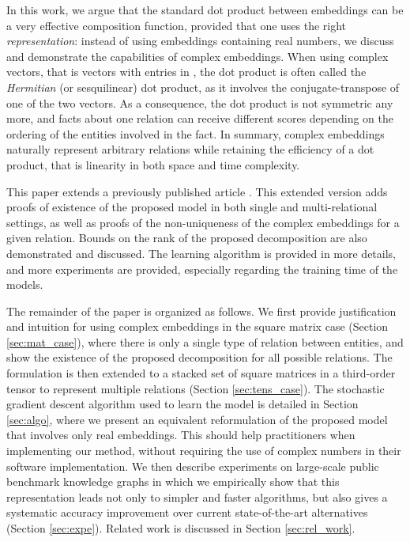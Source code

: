 \documentclass[twoside,11pt]{article}
\renewcommand{\cite}{\citep}
\begin{document}
In this work, we argue that the standard dot product between embeddings can be a very effective composition function, provided that one uses the right \emph{representation}: instead of using embeddings containing real numbers, we discuss and demonstrate the capabilities of complex embeddings. When using complex vectors, that is vectors with entries in ,  the dot product is often called the \emph{Hermitian} (or sesquilinear) dot product, as it involves the conjugate-transpose of one of the two vectors. 
As a consequence, the dot product is not symmetric any more, and facts about one relation can receive different scores depending on the ordering of the entities involved in the fact. 
In summary, complex embeddings naturally represent arbitrary relations while retaining the efficiency of a dot product, that is linearity in both space and time complexity. 



This paper extends a previously published article \cite{trouillon2016}. This extended version adds proofs of existence of the proposed model in both single and multi-relational settings, as well as proofs of the non-uniqueness of the complex embeddings for a given relation. Bounds on the rank of the proposed decomposition are also demonstrated and discussed. The learning algorithm is provided in more details, and more experiments are provided, especially regarding the training time of the models.

The remainder of the paper is organized as follows. We first provide justification and intuition for using complex embeddings in the square matrix case (Section \ref{sec:mat_case}), where there is only a single type of relation between entities, and show the existence of the proposed decomposition for all possible relations. The formulation is then extended to a stacked set of square matrices in a third-order tensor to represent multiple relations (Section \ref{sec:tens_case}). The stochastic gradient descent algorithm used to learn the model is detailed in Section \ref{sec:algo}, where we present an equivalent reformulation of the proposed model that involves only real embeddings. This should help practitioners when implementing our method, without requiring the use of complex numbers in their software implementation. We then describe experiments on large-scale public benchmark knowledge graphs in which we empirically show that this representation leads not only to simpler and faster algorithms, but also gives a systematic accuracy improvement over current state-of-the-art alternatives (Section \ref{sec:expe}). Related work is discussed in Section \ref{sec:rel_work}.
\end{document}
